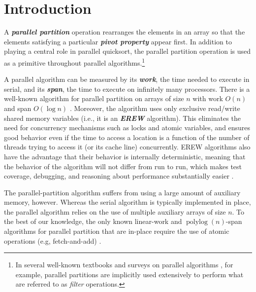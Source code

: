 \documentclass[sigplan, 10pt, nonacm]{acmart}
\newcommand{\defn}[1]{{\textit{\textbf{\boldmath #1}}}}
\theoremstyle{remark}
\theoremstyle{remark}
\begin{document}



\maketitle





 

\section{Introduction}

A \defn{parallel partition} operation rearranges the elements in an
array so that the elements satisfying a particular \defn{pivot
  property} appear first. In addition to playing a central role in
parallel quicksort, the parallel partition operation is used as a
primitive throughout parallel algorithms.\footnote{In several
  well-known textbooks and surveys on parallel algorithms
  \cite{AcarBl16,Blelloch96}, for example, parallel partitions are
  implicitly used extensively to perform what are referred to as
  \emph{filter} operations.}

A parallel algorithm can be measured by its \defn{work}, the time
needed to execute in serial, and its \defn{span}, the time to execute
on infinitely many processors. There is a well-known algorithm for
parallel partition on arrays of size $n$ with work $O(n)$ and span
$O(\log n)$ \cite{Blelloch96,AcarBl16}. Moreover, the algorithm uses
only exclusive read/write shared memory variables (i.e., it is an
\defn{EREW} algorithm). This eliminates the need for concurrency
mechanisms such as locks and atomic variables, and ensures good
behavior even if the time to access a location is a function of the
number of threads trying to access it (or its cache line)
concurrently. EREW algorithms also have the advantage that their
behavior is internally deterministic, meaning that
the behavior of the algorithm will not differ from run to run, which
makes test coverage, debugging, and reasoning about performance
substantially easier \cite{BlellochFi12}.

The parallel-partition algorithm suffers from using a large amount of
auxiliary memory, however. Whereas the serial algorithm is typically
implemented in place, the parallel algorithm relies on the use of multiple
auxiliary arrays of size $n$. To the best of our knowledge, the only
known linear-work and $\operatorname{polylog}(n)$-span algorithms for
parallel partition that are in-place require the use of atomic
operations (e.g, fetch-and-add)
\cite{HeidelbergerNo90,AxtmannWi17,TsigasZh03}.
\end{document}
